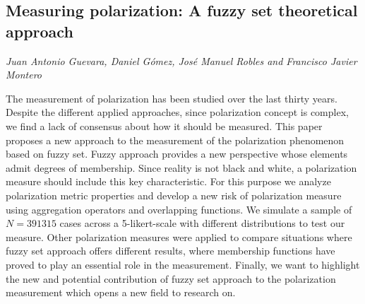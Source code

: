 \documentclass[../booklet.tex]{subfiles}
\begin{document}
\subsection[Measuring polarization: A fuzzy set theoretical approach. {\it Juan Antonio Guevara, Daniel Gómez, José Manuel Robles and Francisco Javier Montero}]{Measuring polarization: A fuzzy set theoretical approach}
   

\begin{center}
  {\it Juan Antonio Guevara, Daniel Gómez, José Manuel Robles and Francisco Javier Montero}
\end{center}

\vskip 0.8cm


The measurement of polarization has been studied over the last thirty years. Despite the different applied approaches, since polarization concept is complex, we find a lack of consensus about how it should be measured. This paper proposes a new approach to the measurement of the polarization phenomenon based on fuzzy set. Fuzzy approach provides a new perspective whose elements admit degrees of membership. Since reality is not black and white, a polarization measure should include this key characteristic. For this purpose we analyze polarization metric properties and develop a new risk of polarization measure using aggregation operators and overlapping functions. We simulate a sample of $N = 391315$ cases across a 5-likert-scale with different distributions to test our measure. Other polarization measures were applied to compare situations where fuzzy set approach offers different results, where membership functions have proved to play an essential role in the measurement. Finally, we want to highlight the new and potential contribution of fuzzy set approach to the polarization measurement which opens a new field to research on.
\end{document}
